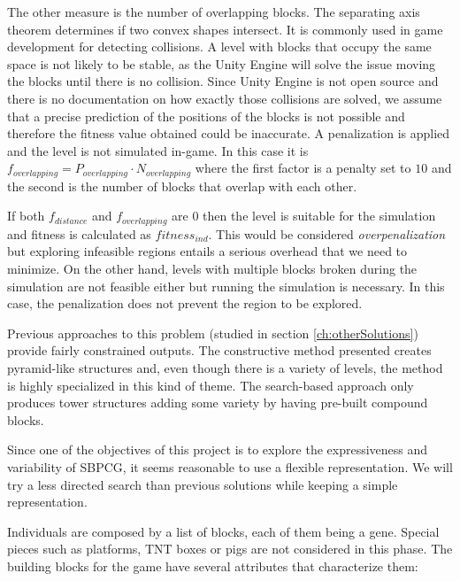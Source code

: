 

The other measure is the number of overlapping blocks. The separating axis theorem\cite{ericson2004real} determines if two convex shapes intersect. It is commonly used in game development for detecting collisions. A level with blocks that occupy the same space is not likely to be stable, as the Unity Engine will solve the issue moving the blocks until there is no collision. Since Unity Engine is not open source and there is no documentation on how exactly those collisions are solved, we assume that a precise prediction of the positions of the blocks is not possible and therefore the fitness value obtained could be inaccurate. A penalization is applied and the level is not simulated in-game. In this case it is $f_{overlapping} = P_{overlapping} \cdot N_{overlapping}$ where the first factor is a penalty set to $10$ and the second is the number of blocks that overlap with each other. 

If both $f_{distance}$ and $f_{overlapping}$ are $0$ then the level is suitable for the simulation and fitness is calculated as $fitness_{ind}$. This would be considered \textit{overpenalization} but exploring infeasible regions entails a serious overhead that we need to minimize. On the other hand, levels with multiple blocks broken during the simulation are not feasible either but running the simulation is necessary. In this case, the penalization does not prevent the region to be explored.

Previous approaches to this problem (studied in section \ref{ch:otherSolutions}) provide fairly constrained outputs. The constructive method presented creates pyramid-like structures and, even though there is a variety of levels, the method is highly specialized in this kind of theme. The search-based approach only produces tower structures adding some variety by having pre-built compound blocks.

Since one of the objectives of this project is to explore the expressiveness and variability of SBPCG, it seems reasonable to use a flexible representation. We will try a less directed search than previous solutions while keeping a simple representation. 

Individuals are composed by a list of blocks, each of them being a gene. Special pieces such as platforms, TNT boxes or pigs are not considered in this phase. The building blocks for the game have several attributes that characterize them: 

